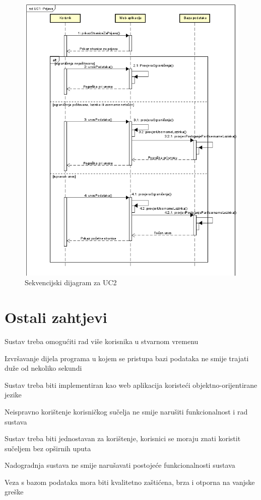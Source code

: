 				\begin{figure}[H]
					\includegraphics[width=\textwidth]{slike/Prijava.png}
					\caption{Sekvencijski dijagram za UC2}
				\end{figure}
				
				\eject
				
				
	
		\section{Ostali zahtjevi}
		
			 
		 
			 \begin{packed_item}
			 \item  Sustav treba omogućiti rad više korisnika u stvarnom vremenu
			 \item Izvršavanje dijela programa u kojem se pristupa bazi podataka ne smije trajati duže od nekoliko sekundi
			 \item Sustav treba biti implementiran kao web aplikacija koristeći objektno-orijentirane jezike
			 \item Neispravno korištenje korisničkog sučelja ne smije narušiti funkcionalnost i rad sustava
			 \item Sustav treba biti jednostavan za korištenje, korisnici se moraju znati koristit sučeljem bez opširnih uputa
			 \item Nadogradnja sustava ne smije narušavati postojeće funkcionalnosti sustava
			 \item Veza s bazom podataka mora biti kvalitetno zaštićena, brza i otporna na vanjske greške
			 \end{packed_item}
	